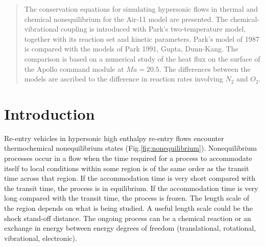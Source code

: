 \documentclass[11pt,a4paper,twocolumn]{article}
\begin{document}



\begin{abstract}
    The conservation equations for simulating hypersonic flows in thermal and chemical nonequilibrium for the Air-11 model are presented. The chemical-vibrational coupling is introduced with Park's two-temperature model, together with its reaction set and kinetic parameters. Park's model of 1987 is compared with the models of Park 1991, Gupta, Dunn-Kang. The comparison is based on a numerical study of the heat flux on the surface of the Apollo command module at $Ma=20.5$. The differences between the models are ascribed to the difference in reaction rates involving $N_2$ and $O_2$.
\end{abstract}

\section{Introduction}
\label{sec:introduction}

Re-entry vehicles in hypersonic high enthalpy re-entry flows encounter thermochemical nonequilibrium states (Fig.\ref{fig:nonequilibrium}). Nonequilibrium processes occur in a flow when the time required for a process to accommodate itself to local conditions within some region is of the same order as the transit time across that region. If the accommodation time is very short compared with the transit time, the process is in equilibrium. If the accommodation time is very long compared with the transit time, the process is frozen. The length scale of the region depends on what is being studied. A useful length scale could be the shock stand-off distance. The ongoing process can be a chemical reaction or an exchange in energy between energy degrees of freedom (translational, rotational,  vibrational, electronic). 
\end{document}
